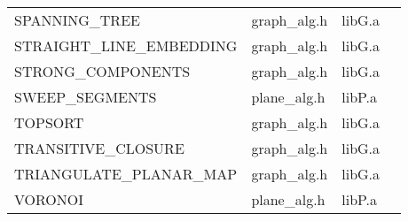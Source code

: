 \begin{tabular}{llll}
SPANNING\_TREE                    &graph\_alg.h   &libG.a           &\pageref{Network Algorithms}\\
STRAIGHT\_LINE\_EMBEDDING         &graph\_alg.h   &libG.a           &\pageref{Algorithms for Planar Graphs}\\
STRONG\_COMPONENTS                &graph\_alg.h   &libG.a           &\pageref{Basic Algorithms}\\
SWEEP\_SEGMENTS                   &plane\_alg.h   &libP.a           &\pageref{Plane Algorithms}\\
TOPSORT                           &graph\_alg.h   &libG.a           &\pageref{Basic Algorithms}\\
TRANSITIVE\_CLOSURE               &graph\_alg.h   &libG.a           &\pageref{Basic Algorithms}\\
TRIANGULATE\_PLANAR\_MAP          &graph\_alg.h   &libG.a           &\pageref{Algorithms for Planar Graphs}\\
VORONOI                           &plane\_alg.h   &libP.a           &\pageref{Plane Algorithms}
\end{tabular}

